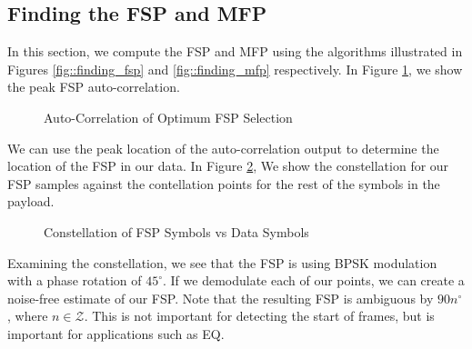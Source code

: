 \documentclass[conference,onecolumn]{IEEEtran}
\begin{document}
\subsection{Finding the FSP and MFP}

In this section, we compute the FSP and MFP using the algorithms illustrated in Figures \ref{fig::finding_fsp} and \ref{fig::finding_mfp} respectively. In Figure \ref{fig::fsp_correlation}, we show the peak FSP auto-correlation.

\begin{figure}[H]
	\centerline{}
	\caption{Auto-Correlation of Optimum FSP Selection}
	\label{fig::fsp_correlation}
\end{figure}

\noindent We can use the peak location of the auto-correlation output to determine the location of the FSP in our data. In Figure \ref{fig::fsp_constellation}, We show the constellation for our FSP samples against the contellation points for the rest of the symbols in the payload.

\begin{figure}[H]
	\centerline{}
	\caption{Constellation of FSP Symbols vs Data Symbols}
	\label{fig::fsp_constellation}
\end{figure}

\noindent Examining the constellation, we see that the FSP is using BPSK modulation with a phase rotation of $45^{\circ}$. If we demodulate each of our points, we can create a noise-free estimate of our FSP. Note that the resulting FSP is ambiguous by $90n^{\circ}$, where $n \in \mathcal{Z}$. This is not important for detecting the start of frames, but is important for applications such as EQ.
\end{document}
